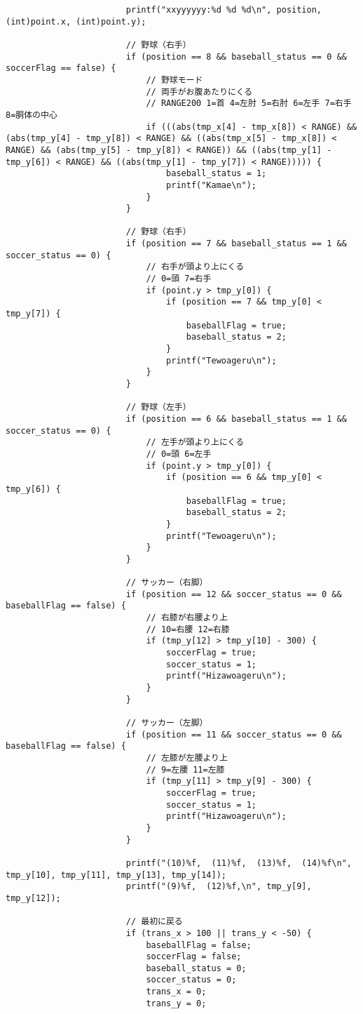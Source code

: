 \begin{lstlisting}
						printf("xxyyyyyy:%d %d %d\n", position, (int)point.x, (int)point.y);

						// 野球（右手）
						if (position == 8 && baseball_status == 0 && soccerFlag == false) {
							// 野球モード
							// 両手がお腹あたりにくる
							// RANGE200 1=首 4=左肘 5=右肘 6=左手 7=右手 8=胴体の中心
							if (((abs(tmp_x[4] - tmp_x[8]) < RANGE) && (abs(tmp_y[4] - tmp_y[8]) < RANGE) && ((abs(tmp_x[5] - tmp_x[8]) < RANGE) && (abs(tmp_y[5] - tmp_y[8]) < RANGE)) && ((abs(tmp_y[1] - tmp_y[6]) < RANGE) && ((abs(tmp_y[1] - tmp_y[7]) < RANGE))))) {  
								baseball_status = 1;
								printf("Kamae\n");
							}
						}

						// 野球（右手）
						if (position == 7 && baseball_status == 1 && soccer_status == 0) {
							// 右手が頭より上にくる
							// 0=頭 7=右手
							if (point.y > tmp_y[0]) {
								if (position == 7 && tmp_y[0] < tmp_y[7]) {
									baseballFlag = true;
									baseball_status = 2;
								}
								printf("Tewoageru\n");
							}
						}

						// 野球（左手）
						if (position == 6 && baseball_status == 1 && soccer_status == 0) {
							// 左手が頭より上にくる
							// 0=頭 6=左手
							if (point.y > tmp_y[0]) {
								if (position == 6 && tmp_y[0] < tmp_y[6]) {
									baseballFlag = true;
									baseball_status = 2;
								}
								printf("Tewoageru\n");
							}
						}

						// サッカー（右脚）
						if (position == 12 && soccer_status == 0 && baseballFlag == false) {
							// 右膝が右腰より上
							// 10=右腰 12=右膝
							if (tmp_y[12] > tmp_y[10] - 300) {
								soccerFlag = true;
								soccer_status = 1;
								printf("Hizawoageru\n");
							}
						}

						// サッカー（左脚）
						if (position == 11 && soccer_status == 0 && baseballFlag == false) {
							// 左膝が左腰より上
							// 9=左腰 11=左膝
							if (tmp_y[11] > tmp_y[9] - 300) {
								soccerFlag = true;
								soccer_status = 1;
								printf("Hizawoageru\n");
							}
						}

						printf("(10)%f,  (11)%f,  (13)%f,  (14)%f\n", tmp_y[10], tmp_y[11], tmp_y[13], tmp_y[14]);
						printf("(9)%f,  (12)%f,\n", tmp_y[9], tmp_y[12]);

						// 最初に戻る
						if (trans_x > 100 || trans_y < -50) {
							baseballFlag = false;
							soccerFlag = false;
							baseball_status = 0;
							soccer_status = 0;
							trans_x = 0;
							trans_y = 0;


\end{lstlisting}
